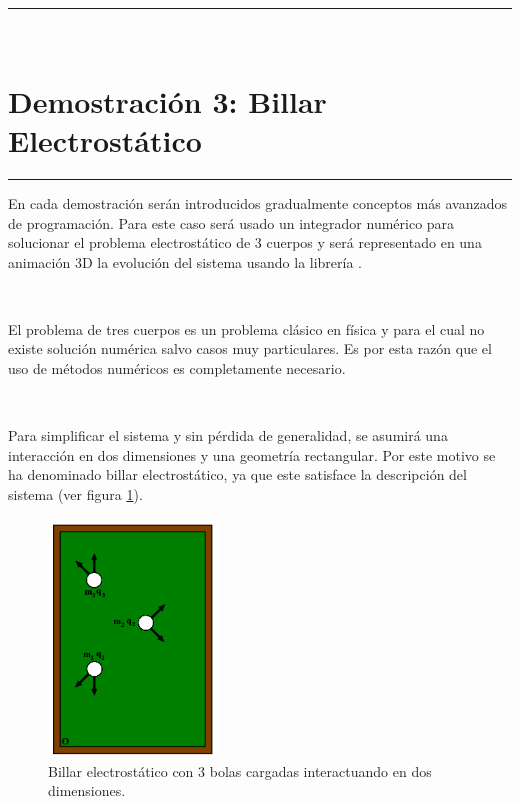  
\rule{14cm}{0.5mm}




\
\section{Demostración 3: Billar Electrostático}
\label{sec:DEMO2_03}
\rule{14cm}{0.5mm}

En cada demostración serán introducidos gradualmente conceptos más avanzados 
de programación. Para este caso será usado un integrador numérico para 
solucionar el problema electrostático de 3 cuerpos y será representado en 
una animación 3D la evolución del sistema usando la librería \mayavi.

\

El problema de tres cuerpos es un problema clásico en física y para el cual
no existe solución numérica salvo casos muy particulares. Es por esta 
razón que el uso de métodos numéricos es completamente necesario. 

\

Para simplificar el sistema y sin pérdida de generalidad, se asumirá una 
interacción en dos dimensiones y una geometría rectangular. Por este 
motivo se ha denominado billar electrostático, ya que este satisface la 
descripción del sistema (ver figura \ref{fig:biliard}).


\begin{figure}[htbp]
	\centering
	\includegraphics[width=0.4\textwidth]
	{./pictures/billiards.png}

	\caption{\small{Billar electrostático con 3 bolas cargadas interactuando
	en dos dimensiones.}}
	
	\label{fig:biliard}
\end{figure}


